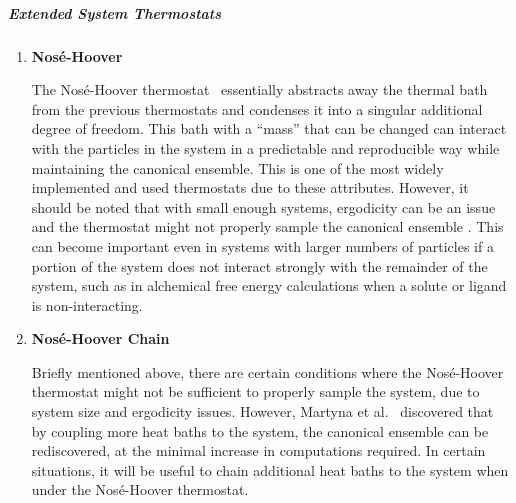 \documentclass[9pt,bestpractices]{livecoms}
\begin{document}
\subparagraph{Extended System Thermostats}
\begin{enumerate}[listparindent=\parindent]

\item {\bf Nos\'{e}-Hoover}

   The Nos\'{e}-Hoover thermostat~\cite{thermostatAlgorithms2005} essentially abstracts away the thermal bath from the previous thermostats and condenses it into a singular additional degree of freedom.
    This bath with a ``mass'' that can be changed can interact with the particles in the system in a predictable and reproducible way while maintaining the
    canonical ensemble.
    This is one of the most widely implemented and used thermostats due to these attributes.
    However, it should be noted that with small enough systems, ergodicity can be an issue and the thermostat might not properly sample the canonical ensemble \cite{martyna1992nose,thermostatAlgorithms2005}. 
    This can become important even in systems with larger numbers of particles if a portion of the system does not interact strongly with the remainder of the system, such as in alchemical free energy calculations when a solute or ligand is non-interacting.
    
    
\item {\bf Nos\'{e}-Hoover Chain}

    Briefly mentioned above, there are certain conditions where the Nos\'{e}-Hoover thermostat might not be sufficient to properly sample the system, due to
   system size and ergodicity issues\cite{martyna1992nose, thermostatAlgorithms2005}. 
    However, Martyna et al.~\cite{martyna1992nose} discovered that by coupling more heat baths to the system, the canonical ensemble can be rediscovered, at the minimal increase in computations required. In certain situations, it will be useful to chain additional heat baths to the system when under the Nos\'{e}-Hoover thermostat.

\end{enumerate}
\end{document}
